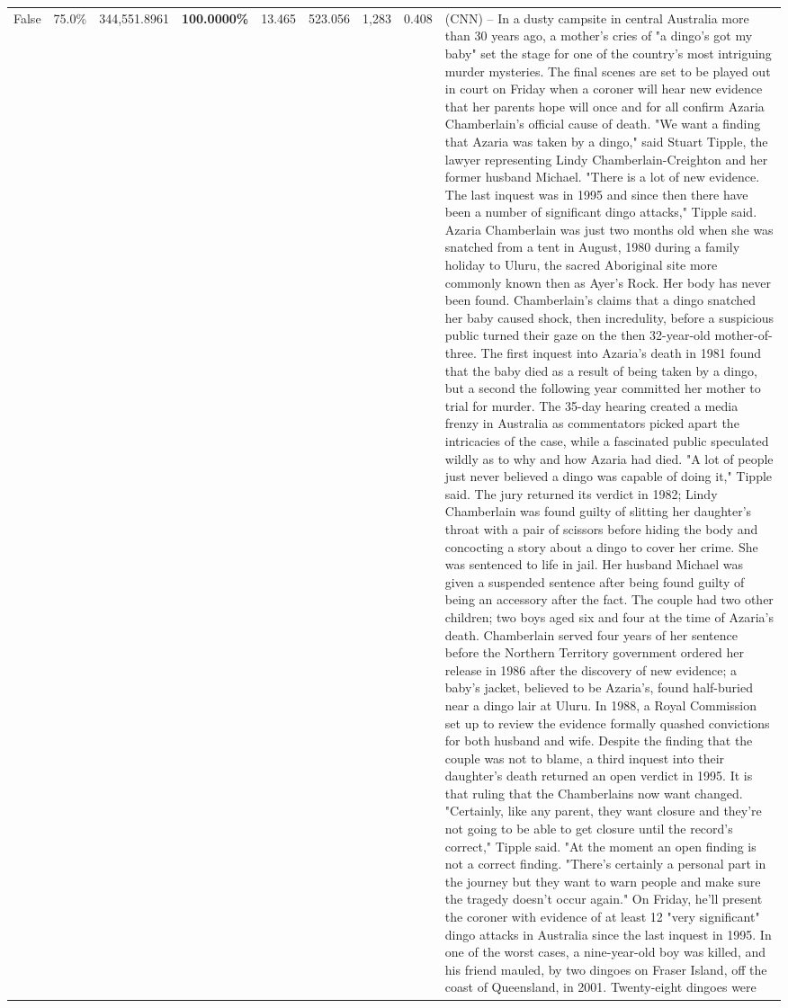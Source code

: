 \begin{table}[H]
\begin{tabular}{lllrlllll}
False & 75.0\% & 344,551.8961 & \bfseries \color{red} 100.0000\% & 13.465 & 523.056 & 1,283 & 0.408 & (CNN) -- In a dusty campsite in central Australia more than 30 years ago, a mother's cries of "a dingo's got my baby" set the stage for one of the country's most intriguing murder mysteries. The final scenes are set to be played out in court on Friday when a coroner will hear new evidence that her parents hope will once and for all confirm Azaria Chamberlain's official cause of death. "We want a finding that Azaria was taken by a dingo," said Stuart Tipple, the lawyer representing Lindy Chamberlain-Creighton and her former husband Michael. "There is a lot of new evidence. The last inquest was in 1995 and since then there have been a number of significant dingo attacks," Tipple said. Azaria Chamberlain was just two months old when she was snatched from a tent in August, 1980 during a family holiday to Uluru, the sacred Aboriginal site more commonly known then as Ayer's Rock. Her body has never been found. Chamberlain's claims that a dingo snatched her baby caused shock, then incredulity, before a suspicious public turned their gaze on the then 32-year-old mother-of-three. The first inquest into Azaria's death in 1981 found that the baby died as a result of being taken by a dingo, but a second the following year committed her mother to trial for murder. The 35-day hearing created a media frenzy in Australia as commentators picked apart the intricacies of the case, while a fascinated public speculated wildly as to why and how Azaria had died. "A lot of people just never believed a dingo was capable of doing it," Tipple said. The jury returned its verdict in 1982; Lindy Chamberlain was found guilty of slitting her daughter's throat with a pair of scissors before hiding the body and concocting a story about a dingo to cover her crime. She was sentenced to life in jail. Her husband Michael was given a suspended sentence after being found guilty of being an accessory after the fact. The couple had two other children; two boys aged six and four at the time of Azaria's death. Chamberlain served four years of her sentence before the Northern Territory government ordered her release in 1986 after the discovery of new evidence; a baby's jacket, believed to be Azaria's, found half-buried near a dingo lair at Uluru. In 1988, a Royal Commission set up to review the evidence formally quashed convictions for both husband and wife. Despite the finding that the couple was not to blame, a third inquest into their daughter's death returned an open verdict in 1995. It is that ruling that the Chamberlains now want changed. "Certainly, like any parent, they want closure and they're not going to be able to get closure until the record's correct," Tipple said. "At the moment an open finding is not a correct finding. "There's certainly a personal part in the journey but they want to warn people and make sure the tragedy doesn't occur again." On Friday, he'll present the coroner with evidence of at least 12 "very significant" dingo attacks in Australia since the last inquest in 1995. In one of the worst cases, a nine-year-old boy was killed, and his friend mauled, by two dingoes on Fraser Island, off the coast of Queensland, in 2001. Twenty-eight dingoes were 
\end{tabular}
\end{table}
